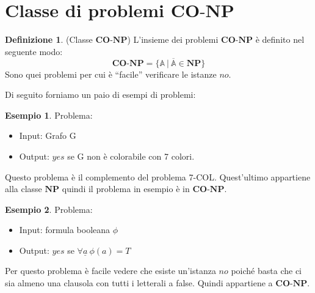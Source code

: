 \documentclass[a4paper]{article}
\theoremstyle{definition}
\newtheorem{esempio}{Esempio}[subsection]
\newtheorem{definit}{Definizione}[subsection]
\newcommand{\np}{\mathbf{NP}}
\newcommand{\conp}{\mathbf{CO}\text{-}\mathbf{NP}}
\newcommand{\prob}[1]{\mathbb{#1}}
\begin{document}
	\section{Classe di problemi $ \conp $}
		\begin{definit}(Classe $ \conp $)
			L'insieme dei problemi $ \conp $ è definito nel seguente modo:
			\[
				\conp = \{\prob{A}\ \big| \ \overline{\prob{A}} \in \np \}
			\]
			Sono quei problemi per cui è ``facile'' verificare le istanze $ no $.
		\end{definit}
		Di seguito forniamo un paio di esempi di problemi:
		\begin{esempio} Problema:
			\begin{itemize}
				\item Input: Grafo G
				\item Output: $ yes $ se G non è colorabile con 7 colori.
			\end{itemize}
			Questo problema è il complemento del problema 7-COL. Quest'ultimo appartiene alla classe $ \np $ quindi il problema in esempio è in $ \conp $.
		\end{esempio}
		
		\begin{esempio} Problema:
			\begin{itemize}
				\item Input: formula booleana $ \phi $
				\item Output: $ yes $ se $ \forall \underline{a} \ \phi(a) = T $
			\end{itemize}
			Per questo problema è facile vedere che esiste un'istanza $ no $ poiché basta che ci sia almeno una clausola con tutti i letterali a false. Quindi appartiene a $ \conp $.
		\end{esempio}
		
\end{document}
